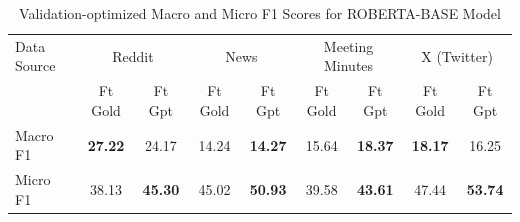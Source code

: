 \begin{table}[htbp]
\centering
\begin{tabular}{l *{8}{c}}
\toprule
Data Source & \multicolumn{2}{c}{Reddit} & \multicolumn{2}{c}{News} & \multicolumn{2}{c}{Meeting Minutes} & \multicolumn{2}{c}{X (Twitter)} \\
& Ft Gold & Ft Gpt & Ft Gold & Ft Gpt & Ft Gold & Ft Gpt & Ft Gold & Ft Gpt \\
\midrule
Macro F1 & \textbf{27.22} & 24.17 & 14.24 & \textbf{14.27} & 15.64 & \textbf{18.37} & \textbf{18.17} & 16.25 \\
Micro F1 & 38.13 & \textbf{45.30} & 45.02 & \textbf{50.93} & 39.58 & \textbf{43.61} & 47.44 & \textbf{53.74} \\
\bottomrule
\end{tabular}
\centering\caption{Validation-optimized Macro and Micro F1 Scores for ROBERTA-BASE Model}
\label{tab:roberta-base_macro_micro}
\end{table}